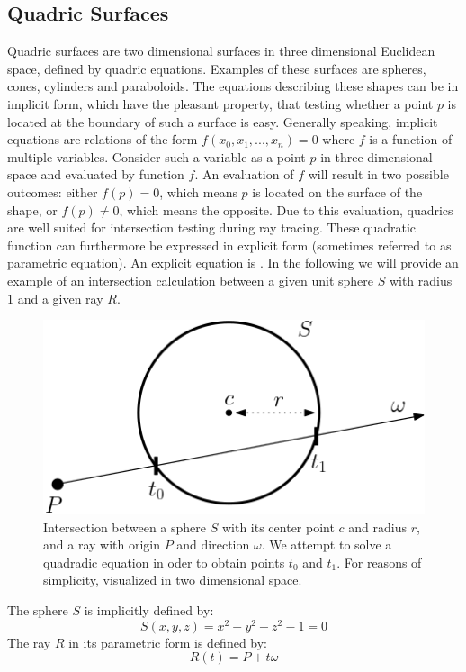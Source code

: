 \subsection{Quadric Surfaces}
\label{sec:quadrics}
Quadric surfaces are two dimensional surfaces in three dimensional Euclidean space, defined by quadric equations. Examples of these surfaces are spheres, cones, cylinders and paraboloids. The equations describing these shapes can be in implicit form, which have the pleasant property, that testing whether a point $p$ is located at the boundary of such a surface is easy. Generally speaking, implicit equations are relations of the form  $f(x_{0}, x_{1}, ..., x_{n}) = 0$ where $f$ is a function of multiple variables. Consider such a variable as a point $p$ in three dimensional space and evaluated by function $f$. An evaluation of $f$ will result in two possible outcomes: either $f(p) = 0$, which means $p$ is located on the surface of the shape, or  $f(p) \ne 0$, which means the opposite.
Due to this evaluation, quadrics are well suited for intersection testing during ray tracing. These quadratic function can furthermore be expressed in explicit form (sometimes referred to as parametric equation). An explicit equation is .
In the following we will provide an example of an intersection calculation between a given unit sphere $S$ with radius $1$ and a given ray $R$. 

\begin{figure}[h]
	\centering
	\includegraphics[width=.5\linewidth]{img/1 fundamentals/sphere_isect.png}
	\caption{Intersection between a sphere $S$ with its center point $c$ and radius $r$, and a ray with origin $P$ and direction $\omega$. We attempt to solve a quadradic equation in oder to obtain points $t_{0}$ and $t_{1}$. For reasons of simplicity, visualized in two dimensional space.} 
	\label{fig:sphere_isect}
\end{figure}

The sphere $S$ is implicitly defined by: 
\begin{equation} \label{eq:sphere}
S(x,y,z) = x^{2}+y^{2}+z^{2}-1 = 0
\end{equation}
The ray $R$ in its parametric form is defined by:
\begin{equation}\label{eq:ray}
R(t) = P + t\omega
\end{equation}

